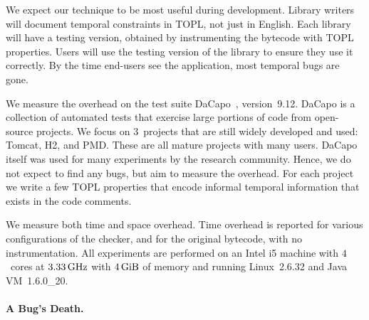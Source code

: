 \documentclass[9pt, preprint]{sigplanconf} %
\theoremstyle{definition}
\theoremstyle{remark}
\begin{document}

We expect our technique to be most useful during development.
Library writers will document temporal constraints in TOPL, not just in English.
Each library will have a testing version, obtained by instrumenting the bytecode with TOPL properties.
Users will use the testing version of the library to ensure they use it correctly.
By the time end-users see the application, most temporal bugs are gone.

We measure the overhead on the test suite DaCapo~\cite{dblp:conf/oopsla/dacapo}, version~9.12.
DaCapo is a collection of automated tests that exercise large portions of code from open-source projects.
We focus on $3$~projects that are still widely developed and used: Tomcat, H2, and PMD\null.
These are all mature projects with many users.
DaCapo itself was used for many experiments by the research community.
Hence, we do not expect to find any bugs, but aim to measure the overhead.
For each project we write a few TOPL properties that encode informal temporal information that exists in the code comments.

We measure both time and space overhead.
Time overhead is reported  for various configurations of the checker, and  for the original bytecode, with no instrumentation.
%
All experiments are performed on an Intel i5 machine with $4$~cores at $3.33\rm\,GHz$ with  $4\rm\,GiB$ of memory and 
running Linux~2.6.32 and Java VM~1.6.0\_20.


\paragraph{A Bug's Death.} %
\end{document}
